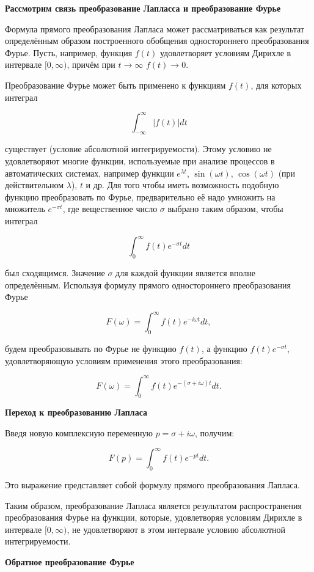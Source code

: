 \textbf{Рассмотрим связь преобразование Лапласса и преобразование Фурье }


Формула  прямого преобразования Лапласа может рассматриваться как результат определённым образом построенного обобщения одностороннего преобразования Фурье. Пусть, например, функция \( f(t) \) удовлетворяет условиям Дирихле в интервале \([0, \infty)\), причём при \( t \to \infty \) \( f(t) \to 0 \).

Преобразование Фурье может быть применено к функциям \( f(t) \), для которых интеграл

\[
\int_{-\infty}^{\infty} |f(t)| dt   
\]

существует (условие абсолютной интегрируемости). Этому условию не удовлетворяют многие функции, используемые при анализе процессов в автоматических системах, например функции \( e^{\lambda t} \), \( \sin(\omega t) \), \( \cos(\omega t) \) (при действительном \( \lambda \)), \( t \) и др. Для того чтобы иметь возможность подобную функцию преобразовать по Фурье, предварительно её надо умножить на множитель \( e^{-\sigma t} \), где вещественное число \( \sigma \) выбрано таким образом, чтобы интеграл

\[
\int_{0}^{\infty} f(t) e^{-\sigma t} dt 
\]

был сходящимся. Значение \( \sigma \) для каждой функции является вполне определённым. Используя формулу прямого одностороннего преобразования Фурье

\[
F(\omega) = \int_{0}^{\infty} f(t) e^{-i \omega t} dt, 
\]

будем преобразовывать по Фурье не функцию \( f(t) \), а функцию \( f(t) e^{-\sigma t} \), удовлетворяющую условиям применения этого преобразования:

\[
F(\omega) = \int_{0}^{\infty} f(t) e^{-(\sigma + i \omega) t} dt. 
\]

\textbf{Переход к преобразованию Лапласа}

Введя новую комплексную переменную \( p = \sigma + i \omega \), получим:

\[
F(p) = \int_{0}^{\infty} f(t) e^{-p t} dt. 
\]

Это выражение представляет собой формулу прямого преобразования Лапласа.

Таким образом, преобразование Лапласа является результатом распространения преобразования Фурье на функции, которые, удовлетворяя условиям Дирихле в интервале \([0, \infty)\), не удовлетворяют в этом интервале условию абсолютной интегрируемости.

\textbf{Обратное преобразование Фурье}

